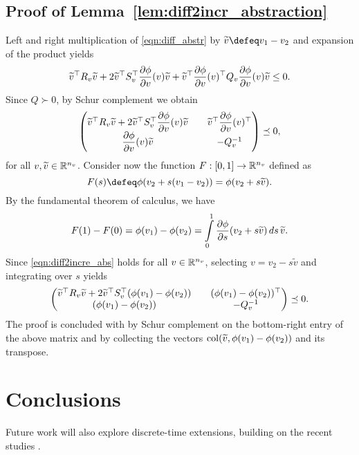 \documentclass{ifacconf}
\begin{document}
\subsection{Proof of Lemma~\ref{lem:diff2incr_abstraction}} \label{sec:proof_lem1}
Left and right multiplication of \eqref{eqn:diff_abstr} by $\widetilde v \defeq v_1-v_2$ and expansion of the product yields
\[
\widetilde v^\top R_v\widetilde v + 2 \widetilde v^\top S_v^\top \dfrac{\partial \phi}{\partial v}(v)\widetilde v +\widetilde v^\top \dfrac{\partial \phi}{\partial v}(v)^\top Q_v \dfrac{\partial \phi}{\partial v}(v)\widetilde v \le 0.
\]
Since $Q\succ 0$, by Schur complement we obtain
\begin{equation}\label{eqn:diff2incre_abs}
\left(\begin{matrix}\widetilde v^\top R_v\widetilde v + 2 \widetilde v^\top S_v^\top \dfrac{\partial \phi}{\partial v}(v)\widetilde v && \widetilde v^\top \dfrac{\partial \phi}{\partial v}(v)^\top\\  \dfrac{\partial \phi}{\partial v}(v)\widetilde v && -Q_v^{-1}\end{matrix}\right) \preceq 0,
\end{equation}
for all $v,\widetilde v \in {\mathbb{R}}^{n_v}$.
Consider now the function $F:[0,1]\to{\mathbb{R}}^{n_v}$ defined as
\[
F(s) \defeq \phi(v_2+s(v_1-v_2)) = \phi(v_2+s\widetilde v).
\]
By the fundamental theorem of calculus, we have
\[
F(1)-F(0)=\phi(v_1)-\phi(v_2) = \int_0^1 \pderiv{\phi}{s}(v_2+s\widetilde v)\, ds \, \widetilde v.
\]
Since \eqref{eqn:diff2incre_abs} holds for all $v\in {\mathbb{R}}^{n_v}$, selecting $v = v_2-s\widetilde v$ and integrating over $s$ yields
\[
\left(\begin{matrix}\widetilde v^\top R_v\widetilde v + 2 \widetilde v^\top S_v^\top (\phi(v_1)-\phi(v_2)) &&  (\phi(v_1)-\phi(v_2))^\top\\   (\phi(v_1)-\phi(v_2)) && -Q_v^{-1}\end{matrix}\right) \preceq 0.
\]
The proof is concluded with by Schur complement on the bottom-right entry of the above matrix and by collecting the vectors $\operatorname{col}(\widetilde v, \phi(v_1)-\phi(v_2)) $ and its transpose.


\section{Conclusions}
Future work will also explore discrete-time extensions, building on the recent studies \citep{zoboli2024k}.


\end{document}
